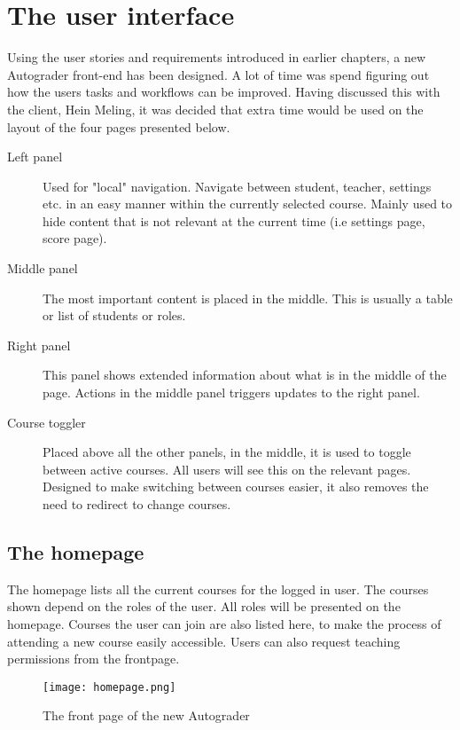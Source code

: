 \section{The user interface}

Using the user stories and requirements introduced in earlier chapters, a new Autograder front-end has been designed. A lot of time was spend figuring out how the users tasks and workflows can be improved. Having discussed this with the client, Hein Meling, it was decided that extra time would be used on the layout of the four pages presented below.

\begin{description}
\item [Left panel] Used for "local" navigation. Navigate between student, teacher, settings etc. in an easy manner within the currently selected course. Mainly used to hide content that is not relevant at the current time (i.e settings page, score page).
\item [Middle panel] The most important content is placed in the middle. This is usually a table or list of students or roles.
\item [Right panel] This panel shows extended information about what is in the middle of the page. Actions in the middle panel triggers updates to the right panel.
\item [Course toggler] Placed above all the other panels, in the middle, it is used to toggle between active courses. All users will see this on the relevant pages. Designed to make switching between courses easier, it also removes the need to redirect to change courses.
\end{description}

\subsection{The homepage}
The homepage lists all the current courses for the logged in user. The courses shown depend on the roles of the user. All roles will be presented on the homepage. Courses the user can join are also listed here, to make the process of attending a new course easily accessible. Users can also request teaching permissions from the frontpage.

\begin{figure}[h!]
	 \centering
   \texttt{[image: homepage.png]}
   \caption{The front page of the new Autograder}
   \label{fig:Wireframes for the new Autograder front-end}
\end{figure}

